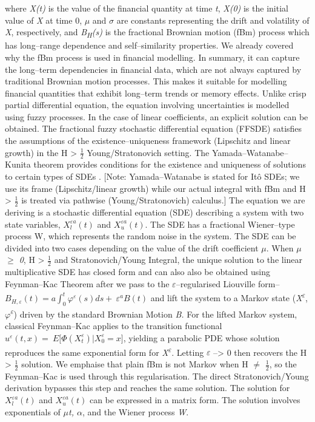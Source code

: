 \documentclass[12pt,a4paper]{report}
\numberwithin{equation}{section}
\begin{document}
where \emph{X(t)} is the value of the financial quantity at time
\emph{t}, \emph{X(0)} is the initial value of \emph{X} at time 0,
\emph{$\mu$} and \emph{$\sigma$} are constants representing the drift and
volatility of \emph{X}, respectively, and \emph{B\textsubscript{H}(s)}
is the fractional Brownian motion (fBm) process which has long--range
dependence and self--similarity properties. We already covered why the
fBm process is used in financial modelling. In summary, it can capture
the long--term dependencies in financial data, which are not always
captured by traditional Brownian motion processes. This makes it
suitable for modelling financial quantities that exhibit long--term
trends or memory effects. Unlike crisp partial differential equation,
the equation involving uncertainties is modelled using fuzzy processes.
In the case of linear coefficients, an explicit solution can be
obtained. The fractional fuzzy stochastic differential equation (FFSDE)
satisfies the assumptions of the existence--uniqueness framework
(Lipschitz and linear growth) in the H \textgreater{} $\frac{1}{2}$
Young/Stratonovich setting. The Yamada--Watanabe--Kunita theorem
provides conditions for the existence and uniqueness of solutions to
certain types of SDEs \cite{watanabe1971uniqueness_90}. {[}Note: Yamada--Watanabe is stated for
Itô SDEs; we use its frame (Lipschitz/linear growth) while our actual
integral with fBm and H \textgreater{} $\frac{1}{2}$ is treated via pathwise
(Young/Stratonovich) calculus.{]} 
The equation we are deriving is a stochastic differential equation (SDE)
describing a system with two state variables,
\(X_{l}^{\varepsilon a}(t)\) and \(X_{u}^{\varepsilon a}(t).\) The SDE
has a fractional Wiener--type process W, which represents the random
noise in the system. The SDE can be divided into two cases depending on
the value of the drift coefficient \emph{$\mu$}. When \emph{$\mu$ $\geq$ 0}, H
\textgreater{} $\frac{1}{2}$ and Stratonovich/Young Integral, the unique solution to
the linear multiplicative SDE has closed form and can also also be
obtained using Feynman--Kac Theorem after we pass to the
\emph{$\varepsilon$}--regularised Liouville form--
\(B_{H,\varepsilon}(t) = a\int_{0}^{t}{\varphi^{\varepsilon}(s)ds + \ \varepsilon^{a}B(t)}\)
and lift the system to a Markov state (\emph{X}\textsuperscript{$\varepsilon$},
\emph{$\varphi$}\textsuperscript{$\varepsilon$}) driven by the standard Brownian Motion
\emph{B.} For the lifted Markov system, classical Feynman--Kac applies to
the transition functional
\(u^{\varepsilon}(t,x) = \ E\lbrack\Phi\left( X_{t}^{\varepsilon} \right)|X_{0}^{\varepsilon} = x\rbrack\),
yielding a parabolic PDE whose solution reproduces the same exponential
form for \emph{X}\textsuperscript{$\varepsilon$}. Letting $\varepsilon$ --\textgreater{} 0 then
recovers the H \textgreater{} $\frac{1}{2}$ solution. We emphaise that plain fBm is
not Markov when H $\neq$ $\frac{1}{2}$, so the Feynman--Kac is used through this
regularisation. The direct Stratonovich/Young derivation bypasses this
step and reaches the same solution. The solution for
\(X_{l}^{\varepsilon a}(t)\) and \(X_{u}^{\varepsilon a}(t)\) can be
expressed in a matrix form. The solution involves exponentials of
\emph{$\mu$t, $\alpha$}, and the Wiener process \emph{W}.
\end{document}
